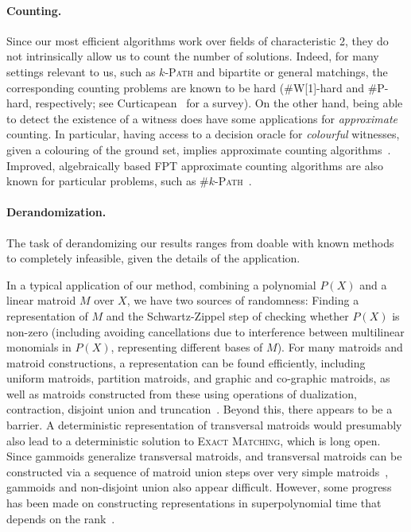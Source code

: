\documentclass{theoretics}
\begin{document}
\paragraph{Counting.} Since our most efficient algorithms work over
fields of characteristic 2, they do not intrinsically allow us to
count the number of solutions. Indeed, for many settings relevant
to us, such as \textsc{$k$-Path} and bipartite or general matchings,
the corresponding counting problems are known to be hard (\#W[1]-hard
and \#P-hard, respectively; see Curticapean~\cite{Curticapean18counting} for a survey). 
On the other hand, being able to detect the existence of a witness
does have some applications for \emph{approximate} counting.
In particular, having access to a decision oracle for
\emph{colourful} witnesses, given a colouring of the ground set,
implies approximate counting algorithms~\cite{BhattacharyaBGM22stacs,DellLM22counting,DellL21}.
Improved, algebraically based FPT approximate counting algorithms are
also known for particular problems, such as \textsc{\#$k$-Path}~\cite{LokshtanovBSZ21countkpath}.

\paragraph{Derandomization.} 
The task of derandomizing our results ranges from doable with known
methods to completely infeasible, given the details of the
application.

In a typical application of our method, 
combining a polynomial $P(X)$ and a linear matroid $M$ over $X$,
we have two sources of randomness: Finding a representation of $M$
and the Schwartz-Zippel step of checking whether $P(X)$ is non-zero
(including avoiding cancellations due to interference between 
multilinear monomials in $P(X)$, representing different bases of $M$).
For many matroids and matroid constructions, a representation can be
found efficiently, including uniform matroids, partition matroids, and
graphic and co-graphic matroids, as well as matroids constructed from
these using operations of dualization, contraction, disjoint union and
truncation~\cite{LokshtanovMPS18,OxleyBook,Marx09-matroid}. 
Beyond this, there appears to be a barrier. A deterministic
representation of transversal matroids would presumably also lead to a
deterministic solution to \textsc{Exact Matching}, which is long open. 
Since gammoids generalize transversal matroids, and transversal
matroids can be constructed via a sequence of matroid union steps
over very simple matroids~\cite{OxleyBook}, gammoids and non-disjoint union
also appear difficult. However, some progress has been made on
constructing representations in superpolynomial time that depends on
the rank~\cite{LokshtanovMP0Z18repr,MisraPR020repr}.
\end{document}
